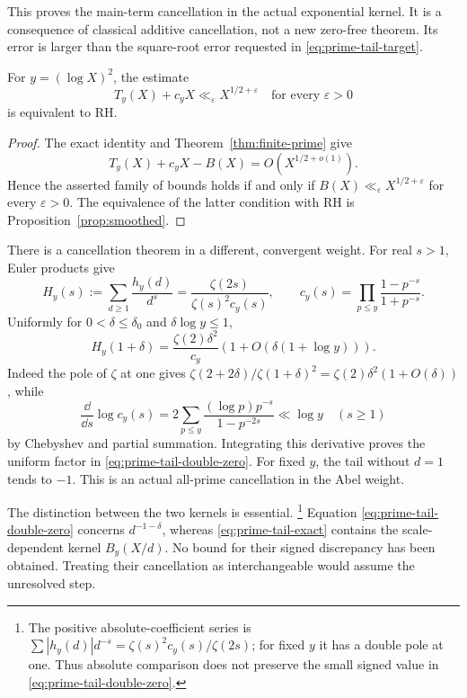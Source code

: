 This proves the main-term cancellation in the actual exponential
kernel. It is a consequence of classical additive cancellation,
not a new zero-free theorem. Its error is larger than the
square-root error requested in \eqref{eq:prime-tail-target}.

\begin{proposition}
\label{prop:prime-tail-rh-equivalence}
For \(y=(\log X)^2\), the estimate
\[
 T_y(X)+c_yX\ll_\varepsilon X^{1/2+\varepsilon}
 \quad\text{for every }\varepsilon>0
\]
is equivalent to RH.
\end{proposition}
\begin{proof}
The exact identity and Theorem~\ref{thm:finite-prime} give
\[
 T_y(X)+c_yX-B(X)=O(X^{1/2+o(1)}).
\]
Hence the asserted family of bounds holds if and only if
\(B(X)\ll_\varepsilon X^{1/2+\varepsilon}\) for every
\(\varepsilon>0\). The equivalence of the latter condition
with RH is Proposition~\ref{prop:smoothed}.
\end{proof}


There is a cancellation theorem in a different, convergent weight.
For real \(s>1\), Euler products give
\begin{equation}\label{eq:prime-tail-abel}
 H_y(s):=\sum_{d\ge1}\frac{h_y(d)}{d^s}
 =\frac{\zeta(2s)}{\zeta(s)^2c_y(s)},\qquad
 c_y(s)=\prod_{p\le y}\frac{1-p^{-s}}{1+p^{-s}}.
\end{equation}
Uniformly for \(0<\delta\le\delta_0\) and
\(\delta\log y\le1\),
\begin{equation}\label{eq:prime-tail-double-zero}
 H_y(1+\delta)
 =\frac{\zeta(2)\delta^2}{c_y}
       \left(1+O(\delta(1+\log y))\right).
\end{equation}
Indeed the pole of \(\zeta\) at one gives
\(\zeta(2+2\delta)/\zeta(1+\delta)^2
=\zeta(2)\delta^2(1+O(\delta))\), while
\[
 \frac{\dd}{\dd s}\log c_y(s)
 =2\sum_{p\le y}\frac{(\log p)p^{-s}}{1-p^{-2s}}
 \ll\log y\quad(s\ge1)
\]
by Chebyshev and partial summation. Integrating this derivative
proves the uniform factor in \eqref{eq:prime-tail-double-zero}.
For fixed \(y\), the tail without \(d=1\) tends to \(-1\).
This is an actual all-prime cancellation in the Abel weight.

The distinction between the two kernels is essential.
\footnote{The positive absolute-coefficient series is
\(\sum |h_y(d)|d^{-s}=\zeta(s)^2c_y(s)/\zeta(2s)\);
for fixed \(y\) it has a double pole at one. Thus absolute
comparison does not preserve the small signed value in
\eqref{eq:prime-tail-double-zero}.}
Equation \eqref{eq:prime-tail-double-zero} concerns
\(d^{-1-\delta}\), whereas \eqref{eq:prime-tail-exact} contains
the scale-dependent kernel \(B_y(X/d)\). No bound for their signed
discrepancy has been obtained. Treating their cancellation as
interchangeable would assume the unresolved step.

